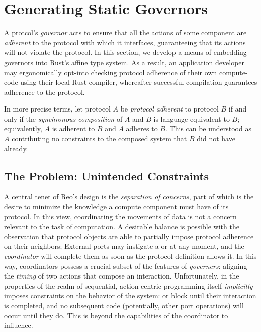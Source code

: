\chapter{Generating Static Governors}
\label{sec:api}
A protcol's \textit{governor} acts to ensure that all the actions of some component are \textit{adherent} to the protocol with which it interfaces, guaranteeing that its actions will not violate the protocol. In this section, we develop a means of embedding governors into Rust's affine type system. As a result, an application developer may ergonomically opt-into checking protocol adherence of their own compute-code using their local Rust compiler, whereafter successful compilation guarantees adherence to the protocol.

In more precise terms, let protocol $A$ be \textit{protocol adherent} to protocol $B$ if and only if the \textit{synchronous composition} of $A$ and $B$ is language-equivalent to $B$; equivalently, $A$ is adherent to $B$ and $A$ adheres to $B$. This can be understood as $A$ contributing no constraints to the composed system that $B$ did not have already.

\section{The Problem: Unintended Constraints}
\label{sec:unintended_constraints}
A central tenet of Reo's design is the \textit{separation of concerns}, part of which is the desire to minimize the knowledge a compute component must have of its protocol. In this view, coordinating the movements of data is not a concern relevant to the task of computation. A desirable balance is possible with the observation that protocol objects are able to partially impose protocol adherence on their neighbors; External ports may instigate a  or  at any moment, and the \textit{coordinator} will complete them as soon as the protocol definition allows it. In this way, coordinators possess a crucial subset of the features of \textit{governers}: aligning the \textit{timing} of two actions that compose an interaction. Unfortunately, in the properties of the realm of sequential, action-centric programming itself \textit{implicitly} imposes constraints on the behavior of the system:  or  block until their interaction is completed, and no subsequent code (potentially, other port operations) will occur until they do. This is beyond the capabilities of the coordinator to influence.

